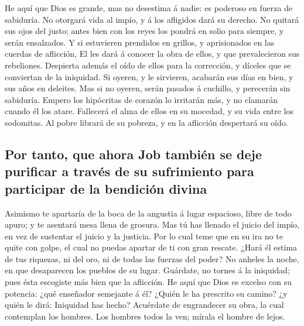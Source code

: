 He aquí que Dios es grande, mas no desestima á nadie: es
poderoso en fuerza de sabiduría.  No otorgará vida al impío,
y á los afligidos dará su derecho.  No quitará sus ojos del
justo; antes bien con los reyes los pondrá en solio para siempre, y
serán ensalzados.  Y si estuvieren prendidos en grillos, y
aprisionados en las cuerdas de aflicción,  El les dará á
conocer la obra de ellos, y que prevalecieron sus rebeliones.
 Despierta además el oído de ellos para la corrección, y
díceles que se conviertan de la iniquidad.  Si oyeren, y le
sirvieren, acabarán sus días en bien, y sus años en deleites.
 Mas si no oyeren, serán pasados á cuchillo, y perecerán
sin sabiduría.  Empero los hipócritas de corazón lo
irritarán más, y no clamarán cuando él los atare. 
Fallecerá el alma de ellos en su mocedad, y su vida entre los sodomitas.
 Al pobre librará de su pobreza, y en la aflicción
despertará su oído.

\hypertarget{por-tanto-que-ahora-job-tambiuxe9n-se-deje-purificar-a-travuxe9s-de-su-sufrimiento-para-participar-de-la-bendiciuxf3n-divina}{%
\subsection{Por tanto, que ahora Job también se deje purificar a través
de su sufrimiento para participar de la bendición
divina}\label{por-tanto-que-ahora-job-tambiuxe9n-se-deje-purificar-a-travuxe9s-de-su-sufrimiento-para-participar-de-la-bendiciuxf3n-divina}}

 Asimismo te apartaría de la boca de la angustia á lugar
espacioso, libre de todo apuro; y te asentará mesa llena de grosura.
 Mas tú has llenado el juicio del impío, en vez de
sustentar el juicio y la justicia.  Por lo cual teme que en
su ira no te quite con golpe, el cual no puedas apartar de ti con gran
rescate.  ¿Hará él estima de tus riquezas, ni del oro, ni
de todas las fuerzas del poder?  No anheles la noche, en
que desaparecen los pueblos de su lugar.  Guárdate, no
tornes á la iniquidad; pues ésta escogiste más bien que la aflicción.
 He aquí que Dios es excelso con su potencia: ¿qué
enseñador semejante á él?  ¿Quién le ha prescrito su
camino? ¿y quién le dirá: Iniquidad has hecho?  Acuérdate
de engrandecer su obra, la cual contemplan los hombres. 
Los hombres todos la ven; mírala el hombre de lejos.

